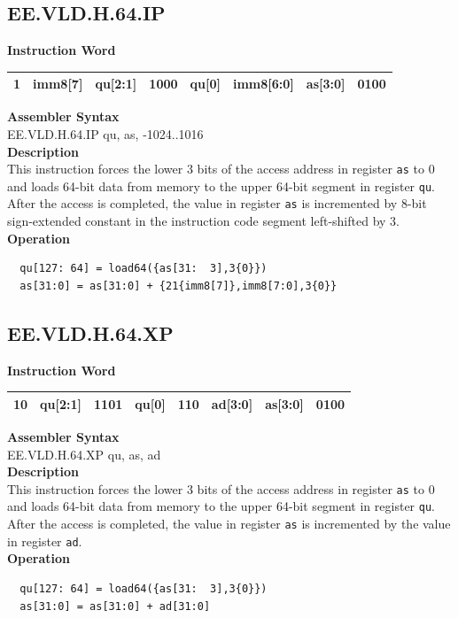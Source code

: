 \clearpage
\subsection{EE.VLD.H.64.IP}\label{instruction:EEVLDH64IP}
\setlength\tabcolsep{6pt}
\textbf{Instruction Word} \\
\begin{tabular}{|c|c|c|c|c|c|c|c|}
	\hline
	1 & imm8[7] & qu[2:1] & 1000 & qu[0] & imm8[6:0] & as[3:0] & 0100 \\
	\hline
\end{tabular}

\textbf{Assembler Syntax} \\
EE.VLD.H.64.IP qu, as, -1024..1016 \\
\textbf{Description} \\
This instruction forces the lower 3 bits of the access address in register \lstinline{as} to 0 and loads 64-bit data from memory to the upper 64-bit segment in register \lstinline{qu}. After the access is completed, the value in register \lstinline{as} is incremented by 8-bit sign-extended constant in the instruction code segment left-shifted by 3.\\
\textbf{Operation}
\begin{lstlisting}
  qu[127: 64] = load64({as[31:  3],3{0}})
  as[31:0] = as[31:0] + {21{imm8[7]},imm8[7:0],3{0}}
\end{lstlisting}

\clearpage
\subsection{EE.VLD.H.64.XP}\label{instruction:EEVLDH64XP}
\setlength\tabcolsep{6pt}
\textbf{Instruction Word} \\
\begin{tabular}{|c|c|c|c|c|c|c|c|}
	\hline
	10 & qu[2:1] & 1101 & qu[0] & 110 & ad[3:0] & as[3:0] & 0100 \\
	\hline
\end{tabular}

\textbf{Assembler Syntax} \\
EE.VLD.H.64.XP qu, as, ad \\
\textbf{Description} \\
This instruction forces the lower 3 bits of the access address in register \lstinline{as} to 0 and loads 64-bit data from memory to the upper 64-bit segment in register \lstinline{qu}. After the access is completed, the value in register \lstinline{as} is incremented by the value in register \lstinline{ad}.\\
\textbf{Operation}
\begin{lstlisting}
  qu[127: 64] = load64({as[31:  3],3{0}})
  as[31:0] = as[31:0] + ad[31:0]
\end{lstlisting}

